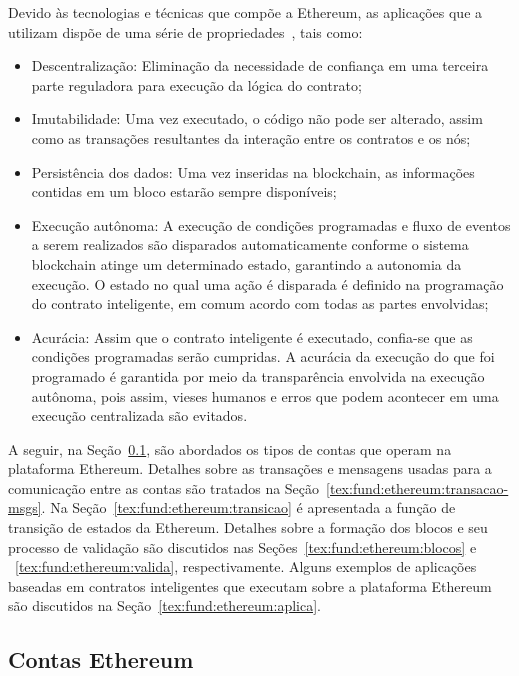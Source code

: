 Devido às tecnologias e técnicas que compõe a Ethereum, as aplicações que a utilizam dispõe de uma série de propriedades~\cite{ethereum2014whitepaper, survey-Hewa2021smart-contract}, tais como:
\begin{itemize}
    \item Descentralização: Eliminação da necessidade de confiança em uma terceira parte reguladora para execução da lógica do contrato;
    \item Imutabilidade: Uma vez executado, o código não pode ser alterado, assim como as transações resultantes da interação entre os contratos e os nós;
    \item Persistência dos dados: Uma vez inseridas na blockchain, as informações contidas em um bloco estarão sempre disponíveis;
    \item Execução autônoma: A execução de condições programadas e fluxo de eventos a serem realizados são disparados automaticamente conforme o sistema blockchain atinge um determinado estado, garantindo a autonomia da execução. O estado no qual uma ação é disparada é definido na programação do contrato inteligente, em comum acordo com todas as partes envolvidas;
    \item Acurácia: Assim que o contrato inteligente é executado, confia-se que as condições programadas serão cumpridas. A acurácia da execução do que foi programado é garantida por meio da transparência envolvida na execução autônoma, pois assim, vieses humanos e erros que podem acontecer em uma execução centralizada são evitados.
\end{itemize}

A seguir, na Seção~\ref{tex:fund:ethereum:clientes}, são abordados os tipos de contas que operam na plataforma Ethereum. Detalhes sobre as transações e mensagens usadas para a comunicação entre as contas são tratados na Seção~\ref{tex:fund:ethereum:transacao-msgs}. Na Seção~\ref{tex:fund:ethereum:transicao} é apresentada a função de transição de estados da Ethereum. Detalhes sobre a formação dos blocos e seu processo de validação são discutidos nas Seções~\ref{tex:fund:ethereum:blocos} e ~\ref{tex:fund:ethereum:valida}, respectivamente. Alguns exemplos de aplicações baseadas em contratos inteligentes que executam sobre a plataforma Ethereum são discutidos na Seção~\ref{tex:fund:ethereum:aplica}. 

\subsection{Contas Ethereum} \label{tex:fund:ethereum:clientes}

